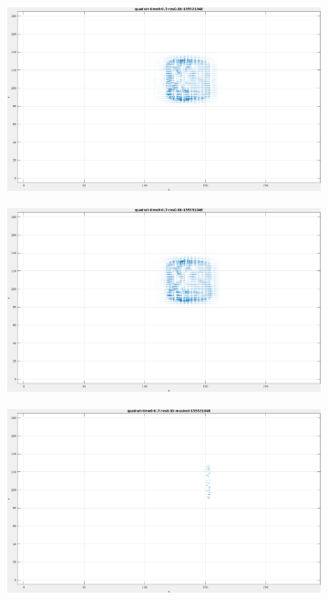 \begin{figure}[tb]
\centering
\begin{subfigure}{.45\textwidth}
  \centering
  \includegraphics[height=.6\linewidth]{figs/quadrat/quadrat-1.png}
  \caption{}
\end{subfigure}
\begin{subfigure}{.45\textwidth}
  \centering
  \includegraphics[height=.6\linewidth]{figs/quadrat/quadrat-2.png}
  \caption{}
\end{subfigure}
\begin{subfigure}{.45\textwidth}
  \includegraphics[height=.6\linewidth]{figs/quadrat/quadrat-masked-1.png}

\end{subfigure}
\end{figure}
